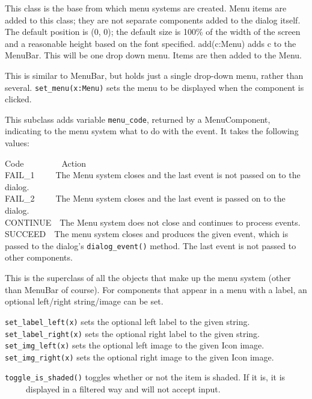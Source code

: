 This class is the base from which menu systems are created. Menu items
are added to this class; they are not separate components added to the
dialog itself. The default position is (0, 0); the default size is
100\% of the width of the screen and a reasonable height based on the
font specified. add(c:Menu) adds c to the MenuBar. This will be one
drop down menu. Items are then added to the Menu.


This is similar to MenuBar, but holds just a single drop-down menu,
rather than several. \texttt{set\_menu(x:Menu)} sets the menu to be displayed
when the component is clicked.


This subclass adds variable \texttt{menu\_code},
returned by a MenuComponent, indicating to the menu system what to do
with the event. It takes the following values:

Code\ \ \ \ \ \ \ \ \ Action\\
FAIL\_1\ \ \ \ \ The Menu system closes and the last event is not passed
on to the dialog.\\
FAIL\_2\ \ \ \ \ The Menu system closes and the last event is passed on to
the dialog.\\
CONTINUE\ \ The Menu system does not close and continues to process
events.\\
SUCCEED\ \ The menu system closes and produces the given event, which is
passed to the
dialog's \texttt{dialog\_event()} method. The last
event is not passed to other components.


This is the superclass of all the objects that make up the menu system
(other than MenuBar of course). For components that appear in a menu
with a label, an optional left/right string/image can be set.

\texttt{set\_label\_left(x)} sets the optional left label to the given
string.\\
\texttt{set\_label\_right(x)} sets the optional right label to the given
string.\\
\texttt{set\_img\_left(x)} sets the optional left image to the given Icon
image.\\
\texttt{set\_img\_right(x)} sets the optional right image to the given Icon
image.

\texttt{toggle\_is\_shaded()} toggles whether or not the item is shaded. If it
is, it is\\
 \ \ \ \ \ displayed in a filtered way and will not accept input.

